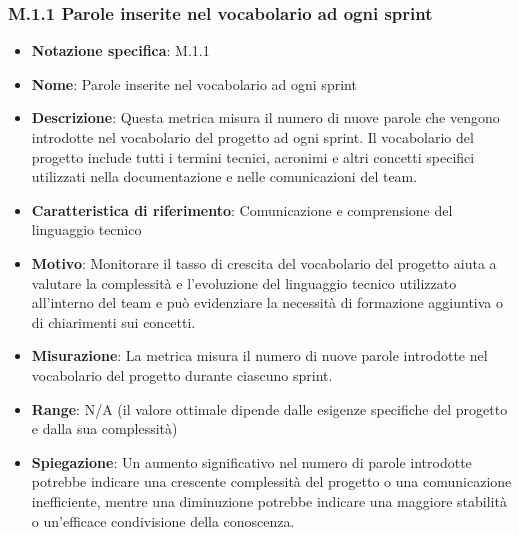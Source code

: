 \subsubsection{M.1.1 Parole inserite nel vocabolario ad ogni sprint}
\begin{itemize}
    \item \textbf{Notazione specifica}: M.1.1
    \item \textbf{Nome}: Parole inserite nel vocabolario ad ogni sprint
    \item \textbf{Descrizione}: Questa metrica misura il numero di nuove parole che vengono introdotte nel vocabolario del progetto ad ogni sprint. Il vocabolario del progetto include tutti i termini tecnici, acronimi e altri concetti specifici utilizzati nella documentazione e nelle comunicazioni del team.
    \item \textbf{Caratteristica di riferimento}: Comunicazione e comprensione del linguaggio tecnico
    \item \textbf{Motivo}: Monitorare il tasso di crescita del vocabolario del progetto aiuta a valutare la complessità e l'evoluzione del linguaggio tecnico utilizzato all'interno del team e può evidenziare la necessità di formazione aggiuntiva o di chiarimenti sui concetti.
    \item \textbf{Misurazione}: La metrica misura il numero di nuove parole introdotte nel vocabolario del progetto durante ciascuno sprint.
    \item \textbf{Range}: N/A (il valore ottimale dipende dalle esigenze specifiche del progetto e dalla sua complessità)
    \item \textbf{Spiegazione}: Un aumento significativo nel numero di parole introdotte potrebbe indicare una crescente complessità del progetto o una comunicazione inefficiente, mentre una diminuzione potrebbe indicare una maggiore stabilità o un'efficace condivisione della conoscenza.
\end{itemize}
